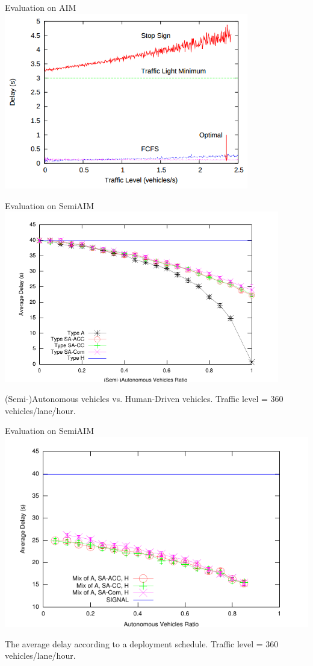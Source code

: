 \documentclass{beamer}
\begin{document}
\begin{frame}{Evaluation on AIM}
\includegraphics[width=0.8\textwidth]{old_result.png}
\end{frame}

\begin{frame}{Evaluation on SemiAIM}
\includegraphics[width=0.9\textwidth]{figures/figure_1.pdf}

(Semi-)Autonomous vehicles vs. Human-Driven vehicles. Traffic
level = 360 vehicles/lane/hour.
\end{frame}

\begin{frame}{Evaluation on SemiAIM}
\includegraphics[width=0.9\columnwidth]{figures/figure_3.pdf}

The average delay according to a deployment schedule. Traffic level =
360 vehicles/lane/hour.
\end{frame}
\end{document}
